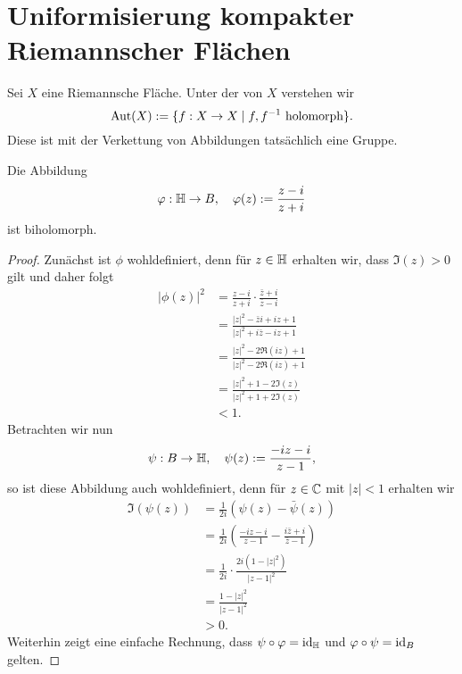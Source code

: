 
\section{Uniformisierung kompakter Riemannscher Flächen}
\label{sec:uniformisierung}

\begin{defin}
  Sei $X$ eine Riemannsche Fläche. Unter der
   von $X$ verstehen wir
  \[
  \operatorname{Aut}(X) := \{ f: X \rightarrow X \mid f,f^{-1} \text{ holomorph} \}.
  \]
  Diese ist mit der Verkettung von Abbildungen tatsächlich eine Gruppe.
\end{defin}

\begin{lemma}
  \label{lemma:kreis-halbebene}
  Die Abbildung
  \[
  \varphi: \mathbb{H} \rightarrow B, \quad \varphi(z) := \frac{z-i}{z+i}
  \]
  ist biholomorph.
\end{lemma}

\begin{proof}
  Zunächst ist $\phi$ wohldefiniert, denn für $z \in \mathbb{H}$ erhalten wir,
  dass $\Im(z) > 0$ gilt und daher folgt
  \begin{align*}
    |\phi(z)|^2 & = \frac{z-i}{z+i} \cdot \frac{\bar z + i}{\bar z -
      i} \\
    & = \frac{|z|^2 - \bar z i + i z + 1}{|z|^2 +i \bar z - i z + 1}
    \\
    & = \frac{|z|^2 - 2 \Re(iz) + 1}{|z|^2 - 2 \Re(iz) + 1} \\
    & = \frac{|z|^2 +1 - 2 \Im(z)}{|z|^2 + 1 + 2\Im(z)} \\
    & < 1.
  \end{align*}
  Betrachten wir nun
  \[
  \psi: B \rightarrow \mathbb{H}, \quad \psi(z) := \frac{ -iz - i}{z-1},
  \]
  so ist diese Abbildung auch wohldefiniert, denn für $z \in \mathbb{C}$ mit
  $|z| < 1$ erhalten wir
  \begin{align*}
    \Im(\psi(z)) & = \frac{1}{2i} ( \psi(z) - \bar \psi(z)) \\
    & = \frac{1}{2i} \left ( \frac{-iz - i}{z -1 } - \frac{ i \bar z +
        i}{\bar z - 1} \right ) \\
    & = \frac{1}{2i} \cdot \frac{2i ( 1- |z|^2 )}{|z -1|^2} \\
    & = \frac{1- |z|^2}{|z-1|^2} \\
    & > 0.
  \end{align*}
  Weiterhin zeigt eine einfache Rechnung, dass $\psi \circ \varphi =
  \operatorname{id}_{\mathbb{H}}$ und $\varphi \circ \psi = \operatorname{id}_B$ gelten.
\end{proof}

